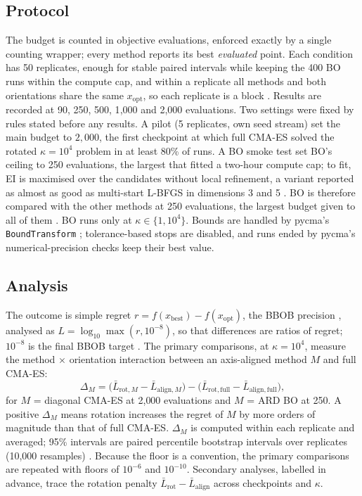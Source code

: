 \documentclass[12pt]{article}
\begin{document}
\subsection{Protocol}
The budget is counted in objective evaluations, enforced exactly by a single counting wrapper; every method reports its best \emph{evaluated} point. Each condition has 50 replicates, enough for stable paired intervals while keeping the 400 BO runs within the compute cap, and within a replicate all methods and both orientations share the same $x_{\mathrm{opt}}$, so each replicate is a block \parencite[p.~309]{montgomery2017design}. Results are recorded at 90, 250, 500, 1{,}000 and 2{,}000 evaluations. Two settings were fixed by rules stated before any results. A pilot (5 replicates, own seed stream) set the main budget to $2{,}000$, the first checkpoint at which full CMA-ES solved the rotated $\kappa=10^4$ problem in at least 80\% of runs. A BO smoke test set BO's ceiling to 250 evaluations, the largest that fitted a two-hour compute cap; to fit, EI is maximised over the candidates without local refinement, a variant reported as almost as good as multi-start L-BFGS in dimensions 3 and 5 \parencite{leriche2021revisiting}. BO is therefore compared with the other methods at 250 evaluations, the largest budget given to all of them \parencite{hansen2016procedure}. BO runs only at $\kappa\in\{1,10^4\}$. Bounds are handled by pycma's \texttt{BoundTransform} \parencite{hansen2019pycma}; tolerance-based stops are disabled, and runs ended by pycma's numerical-precision checks keep their best value.

\subsection{Analysis}
The outcome is simple regret $r=f(x_{\mathrm{best}})-f(x_{\mathrm{opt}})$, the BBOB precision \parencite{hansen2009setup}, analysed as $L=\log_{10}\max(r,10^{-8})$, so that differences are ratios of regret; $10^{-8}$ is the final BBOB target \parencite{hansen2009setup}. The primary comparisons, at $\kappa=10^4$, measure the method $\times$ orientation interaction \parencite[p.~232]{montgomery2017design} between an axis-aligned method $M$ and full CMA-ES:
\begin{equation}
\label{eq:interaction}
\Delta_M=\big(\bar L_{\mathrm{rot},M}-\bar L_{\mathrm{align},M}\big)-\big(\bar L_{\mathrm{rot,full}}-\bar L_{\mathrm{align,full}}\big),
\end{equation}
for $M$ = diagonal CMA-ES at 2{,}000 evaluations and $M$ = ARD BO at 250. A positive $\Delta_M$ means rotation increases the regret of $M$ by more orders of magnitude than that of full CMA-ES. $\Delta_M$ is computed within each replicate and averaged; 95\% intervals are paired percentile bootstrap intervals over replicates (10{,}000 resamples) \parencite[pp.~185--190]{efron2016casi}. Because the floor is a convention, the primary comparisons are repeated with floors of $10^{-6}$ and $10^{-10}$. Secondary analyses, labelled in advance, trace the rotation penalty $\bar L_{\mathrm{rot}}-\bar L_{\mathrm{align}}$ across checkpoints and $\kappa$.
\end{document}
